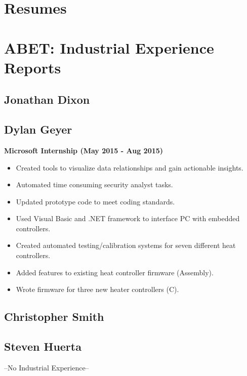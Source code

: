 

\section{Resumes}



	 
     
     
     
          

\section{ABET:  Industrial Experience Reports}

\subsection{Jonathan Dixon}

% 

\subsection{Dylan Geyer}
\large{\textbf{Microsoft Internship (May 2015 - Aug 2015)}}
\begin{itemize}
	\item Created tools to visualize data relationships and gain actionable insights.
	\item Automated time consuming security analyst tasks.
	\item Updated prototype code to meet coding standards.
\end{itemize}

\begin{itemize}
	\item Used Visual Basic and .NET framework to interface PC with embedded controllers.
	\item Created automated testing/calibration systems for seven different heat controllers.
	\item Added features to existing heat controller firmware (Assembly).
	\item Wrote firmware for three new heater controllers (C).
\end{itemize}
% 

\subsection{Christopher Smith}

% 

\subsection{Steven Huerta}
--No Industrial Experience--
